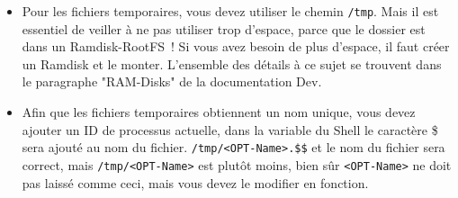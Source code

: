 \begin{itemize}
      \item Pour les fichiers temporaires, vous devez utiliser le chemin \texttt{/tmp}.
        Mais il est essentiel de veiller à ne pas utiliser trop d’espace, parce que
		le dossier est dans un Ramdisk-RootFS~! Si vous avez besoin de plus d'espace,
		il faut créer un Ramdisk et le monter. L’ensemble des détails à ce sujet se
		trouvent dans le paragraphe "RAM-Disks" de la documentation Dev.

      \item Afin que les fichiers temporaires obtiennent un nom unique, vous devez
		ajouter un ID de processus actuelle, dans la variable du Shell le caractère
		\og{}\$\fg{} sera ajouté au nom du fichier. \texttt{/tmp/<OPT-Name>.\$\$} et le nom
		du fichier sera correct, mais \texttt{/tmp/<OPT-Name>} est plutôt moins, bien sûr
		\texttt{<OPT-Name>} ne doit pas laissé comme ceci, mais vous devez le modifier en fonction.

\end{itemize}

